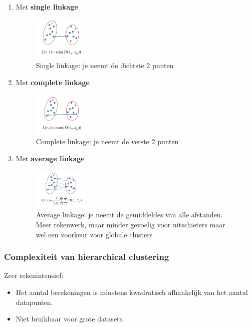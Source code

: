 \documentclass{article}
\begin{document}
\begin{enumerate}
    \item Met \textbf{single linkage}
    \begin{figure}[H]
        \centering
        \includegraphics[width=0.25\textwidth]{single-linkage.png}
        \caption{Single linkage: je neemt de dichtste 2 punten}
    \end{figure}
    \item Met \textbf{complete linkage}
    \begin{figure}[H]
        \centering
        \includegraphics[width=0.25\textwidth]{complete-linkage.png}
        \caption{Complete linkage: je neemt de verste 2 punten}
    \end{figure}
    \item Met \textbf{average linkage}
    \begin{figure}[H]
        \centering
        \includegraphics[width=0.25\textwidth]{average-linkage.png}
        \caption{Average linkage: je neemt de gemiddeldes van alle afstanden. Meer rekenwerk, maar minder gevoelig voor uitschieters maar wel een voorkeur voor globale clusters}
    \end{figure}
\end{enumerate}

\subsubsection{Complexiteit van hierarchical clustering}

Zeer rekenintensief:

\begin{itemize}
    \item Het aantal berekeningen is minstens kwadratisch afhankelijk van het aantal datapunten.
    \item Niet bruikbaar voor grote datasets.
\end{itemize}
\end{document}
